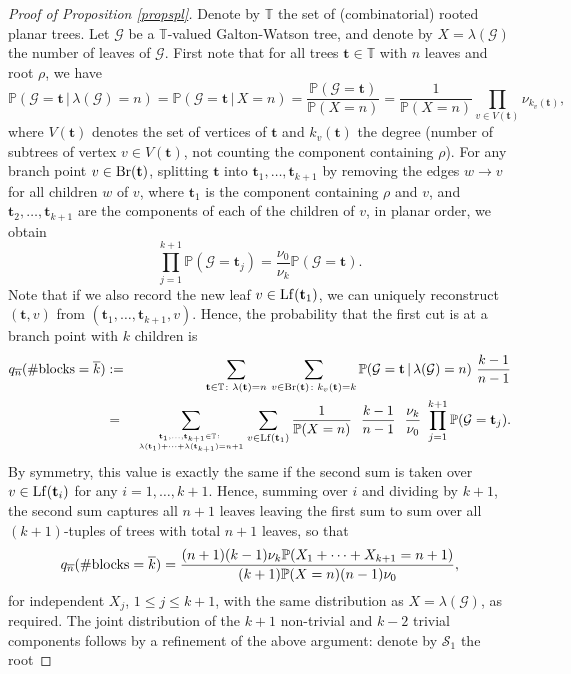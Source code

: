 \documentclass[11pt,a4paper]{article}
\newcommand{\bP}{\mathbb{P}}
\newcommand{\bT}{\mathbb{T}}
\newcommand{\cG}{\mathcal{G}}
\newcommand{\cS}{\mathcal{S}}
\newcommand{\ft}{\mathbf{t}}
\begin{document}
\begin{proof}[Proof of Proposition \ref{propspl}] Denote by $\bT$ the set of (combinatorial) rooted planar trees. Let $\cG$ be a $\bT$-valued Galton-Watson tree,
  and denote by $X=\lambda(\cG)$ the number of leaves of $\cG$. First
  note that for all trees $\ft \in\bT$ with $n$ leaves and root $\rho$, we have
  $$\bP(\cG=\ft\,|\,\lambda(\cG)=n)=\bP(\cG=\ft\,|\,X=n)=\frac{\bP(\cG=\ft )}{\bP(X=n)}=\frac{1}{\bP(X=n)}\prod_{v\in V(\ft)}\nu_{k_v(\ft )},$$
  where $V(\ft )$ denotes the set of vertices of $\ft $ and $k_v(\ft)$ the degree (number of subtrees of vertex $v\in V(\ft)$, not counting the component containing $\rho$).
  For any branch point $v\in{\rm Br}(\ft)$, splitting $\ft$
  into $\ft_1,\ldots,\ft_{k+1}$ by removing the edges $w\rightarrow v$ for all children $w$ of $v$,
  where $\ft_1$ is the component containing $\rho$ and $v$, and $\ft_2,\ldots,\ft_{k+1}$ are the components of each of the children of $v$, in planar order, we obtain
  $$\prod_{j=1}^{k+1}\bP(\cG=\ft_j)=\frac{\nu_0}{\nu_k}\bP(\cG=\ft ).$$
  Note that if we also record the new leaf $v\in{\rm Lf}(\ft_1)$, we can uniquely reconstruct $(\ft ,v)$ from $(\ft_1,\ldots,\ft_{k+1},v)$. Hence, the probability
  that the first cut is at a branch point with $k$ children is
  \begin{eqnarray*}q_{\overline{n}}(\#{\rm blocks}=\overline{k})&:=&\sum_{\ft \in\bT\colon\lambda(\ft )=n}\,\sum_{v\in{\rm Br}(\ft )\colon k_v(\ft )=k}\bP(\cG=\ft\,|\,\lambda(\cG)=n)\ \frac{k-1}{n-1}\\
    &=&\sum_{\genfrac{}{}{0pt}{}{\ft_1,\ldots,\ft_{k+1}\in\bT\colon}{\lambda(\ft_1)+\cdots+\lambda(\ft_{k+1})=n+1}}\sum_{v\in{\rm Lf}(\ft _1)}\frac{1}{\bP(X=n)}\ \ \frac{k-1}{n-1}\ \ \frac{\nu_k}{\nu_0}\ \prod_{j=1}^{k+1}\bP(\cG=\ft_j).
  \end{eqnarray*}
  By symmetry, this value is exactly the same if the second sum is taken over $v\in{\rm Lf}(\ft_i)$ for any $i=1,\ldots,k+1$. Hence, summing over $i$ and dividing by $k+1$, the second sum captures all $n+1$ leaves leaving the first sum to sum over all $(k+1)$-tuples of trees with total $n+1$ leaves, so that
  $$q_{\overline{n}}(\#{\rm blocks}=\overline{k})=\frac{(n+1)(k-1)\nu_k\bP(X_1+\cdots+X_{k+1}=n+1)}{(k+1)\bP(X=n)(n-1)\nu_0},$$
  for independent $X_j$, $1\le j\le k+1$, with the same distribution as $X=\lambda(\cG)$, as required. The joint distribution of the $k+1$ non-trivial and $k-2$ trivial components follows by a refinement of the above argument: denote by $\cS_1$ the root

\end{proof}
\end{document}
